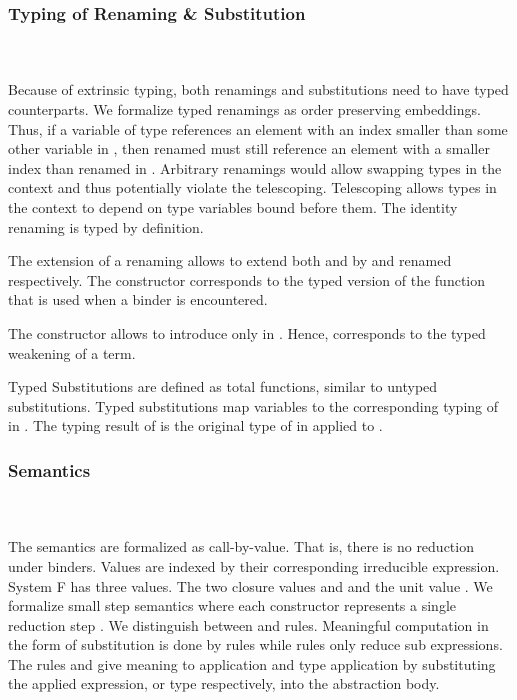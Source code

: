 \subsubsection{Typing of Renaming \& Substitution}\hfill\\\\
Because of extrinsic typing, both renamings and substitutions need to have typed counterparts.
We formalize typed renamings  as order preserving embeddings. 
Thus, if a variable  of type    references an element with an index smaller than some other variable  in , then renamed  must still reference an element with a smaller index than renamed  in .
Arbitrary renamings would allow swapping types in the context and thus potentially violate the telescoping. 
Telescoping allows types in the context to depend on type variables bound before them.
\FRenTyping
The identity renaming  is typed by definition. 

\noindent The extension of a renaming  allows to extend both  and  by  and renamed  respectively. The constructor  corresponds to the typed version of the function  that is used when a binder is encountered. 

\noindent The constructor  allows to introduce  only in . 
Hence,  corresponds to the typed weakening of a term.

\noindent Typed Substitutions are defined as total functions, similar to untyped substitutions.
\FSubTyping
Typed substitutions  map variables    to the corresponding typing of  in . The typing result of  is the original type of  in  applied to .
\subsubsection{Semantics}\hfill\\\\
The semantics are formalized as call-by-value. That is, there is no reduction under binders. Values are indexed by their corresponding irreducible expression.
\FVal
System F has three values. The two closure values  and  and the unit value .
We formalize small step semantics where each constructor represents a single reduction step   .
We distinguish between  and  rules. 
Meaningful computation in the form of substitution is done by  rules while  rules only reduce sub expressions.
\FSemantics
The rules  and  give meaning to application and type application by substituting the applied expression, or type respectively, into the abstraction body. 

